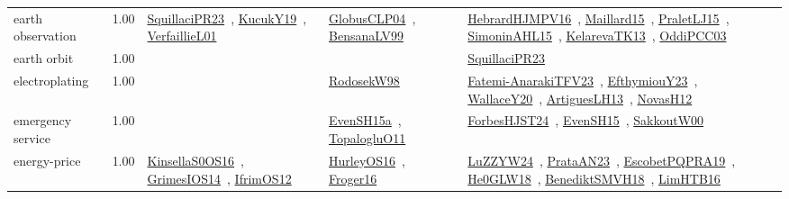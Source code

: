 {\begin{longtable}{p{3cm}r>{\raggedright\arraybackslash}p{6cm}>{\raggedright\arraybackslash}p{6cm}>{\raggedright\arraybackslash}p{8cm}}
\index{earth observation}\index{ApplicationAreas!earth observation}earth observation &  1.00 & \href{../works/SquillaciPR23.pdf}{SquillaciPR23}~\cite{SquillaciPR23}, \href{../works/KucukY19.pdf}{KucukY19}~\cite{KucukY19}, \href{../works/VerfaillieL01.pdf}{VerfaillieL01}~\cite{VerfaillieL01} & \href{../works/GlobusCLP04.pdf}{GlobusCLP04}~\cite{GlobusCLP04}, \href{../works/BensanaLV99.pdf}{BensanaLV99}~\cite{BensanaLV99} & \href{../works/HebrardHJMPV16.pdf}{HebrardHJMPV16}~\cite{HebrardHJMPV16}, \href{../works/Maillard15.pdf}{Maillard15}~\cite{Maillard15}, \href{../works/PraletLJ15.pdf}{PraletLJ15}~\cite{PraletLJ15}, \href{../works/SimoninAHL15.pdf}{SimoninAHL15}~\cite{SimoninAHL15}, \href{../works/KelarevaTK13.pdf}{KelarevaTK13}~\cite{KelarevaTK13}, \href{../works/OddiPCC03.pdf}{OddiPCC03}~\cite{OddiPCC03}\\
\index{earth orbit}\index{ApplicationAreas!earth orbit}earth orbit &  1.00 &  &  & \href{../works/SquillaciPR23.pdf}{SquillaciPR23}~\cite{SquillaciPR23}\\
\index{electroplating}\index{ApplicationAreas!electroplating}electroplating &  1.00 &  & \href{../works/RodosekW98.pdf}{RodosekW98}~\cite{RodosekW98} & \href{../works/Fatemi-AnarakiTFV23.pdf}{Fatemi-AnarakiTFV23}~\cite{Fatemi-AnarakiTFV23}, \href{../works/EfthymiouY23.pdf}{EfthymiouY23}~\cite{EfthymiouY23}, \href{../works/WallaceY20.pdf}{WallaceY20}~\cite{WallaceY20}, \href{../works/ArtiguesLH13.pdf}{ArtiguesLH13}~\cite{ArtiguesLH13}, \href{../works/NovasH12.pdf}{NovasH12}~\cite{NovasH12}\\
\index{emergency service}\index{ApplicationAreas!emergency service}emergency service &  1.00 &  & \href{../works/EvenSH15a.pdf}{EvenSH15a}~\cite{EvenSH15a}, \href{../works/TopalogluO11.pdf}{TopalogluO11}~\cite{TopalogluO11} & \href{../works/ForbesHJST24.pdf}{ForbesHJST24}~\cite{ForbesHJST24}, \href{../works/EvenSH15.pdf}{EvenSH15}~\cite{EvenSH15}, \href{../works/SakkoutW00.pdf}{SakkoutW00}~\cite{SakkoutW00}\\
\index{energy-price}\index{ApplicationAreas!energy-price}energy-price &  1.00 & \href{../works/KinsellaS0OS16.pdf}{KinsellaS0OS16}~\cite{KinsellaS0OS16}, \href{../works/GrimesIOS14.pdf}{GrimesIOS14}~\cite{GrimesIOS14}, \href{../works/IfrimOS12.pdf}{IfrimOS12}~\cite{IfrimOS12} & \href{../works/HurleyOS16.pdf}{HurleyOS16}~\cite{HurleyOS16}, \href{../works/Froger16.pdf}{Froger16}~\cite{Froger16} & \href{../works/LuZZYW24.pdf}{LuZZYW24}~\cite{LuZZYW24}, \href{../works/PrataAN23.pdf}{PrataAN23}~\cite{PrataAN23}, \href{../works/EscobetPQPRA19.pdf}{EscobetPQPRA19}~\cite{EscobetPQPRA19}, \href{../works/He0GLW18.pdf}{He0GLW18}~\cite{He0GLW18}, \href{../works/BenediktSMVH18.pdf}{BenediktSMVH18}~\cite{BenediktSMVH18}, \href{../works/LimHTB16.pdf}{LimHTB16}~\cite{LimHTB16}\\

\end{longtable}}
